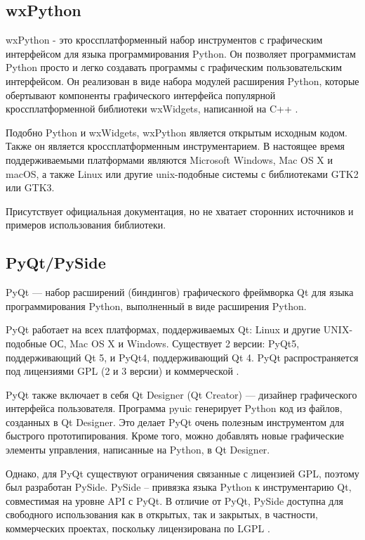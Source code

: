 \documentclass[14pt]{extreport}
\begin{document}
\subsection{wxPython}
wxPython - это кроссплатформенный набор инструментов с графическим интерфейсом для языка программирования Python. Он позволяет программистам Python просто и легко создавать программы с графическим пользовательским интерфейсом. Он реализован в виде набора модулей расширения Python, которые обертывают компоненты графического интерфейса популярной кроссплатформенной библиотеки wxWidgets, написанной на C++ \cite{wxpython}.

Подобно Python и wxWidgets, wxPython является открытым исходным кодом. Также он является кроссплатформенным инструментарием. В настоящее время поддерживаемыми платформами являются Microsoft Windows, Mac OS X и macOS, а также Linux или другие unix-подобные системы с библиотеками GTK2 или GTK3.

Присутствует официальная документация, но не хватает сторонних источников и примеров использования библиотеки.

\subsection{PyQt/PySide}
PyQt — набор расширений (биндингов) графического фреймворка Qt для языка программирования Python, выполненный в виде расширения Python.

PyQt работает на всех платформах, поддерживаемых Qt: Linux и другие UNIX-подобные ОС, Mac OS X и Windows. Существует 2 версии: PyQt5, поддерживающий Qt 5, и PyQt4, поддерживающий Qt 4. PyQt распространяется под лицензиями GPL (2 и 3 версии) и коммерческой \cite{pyqt}. 

PyQt также включает в себя Qt Designer (Qt Creator) — дизайнер графического интерфейса пользователя. Программа pyuic генерирует Python код из файлов, созданных в Qt Designer. Это делает PyQt очень полезным инструментом для быстрого прототипирования. Кроме того, можно добавлять новые графические элементы управления, написанные на Python, в Qt Designer. 

Однако, для PyQt существуют ограничения связанные с лицензией GPL, поэтому был разработан PySide. PySide -- привязка языка Python к инструментарию Qt, совместимая на уровне API с PyQt. В отличие от PyQt, PySide доступна для свободного использования как в открытых, так и закрытых, в частности, коммерческих проектах, поскольку лицензирована по LGPL \cite{pyside}. 
\end{document}
